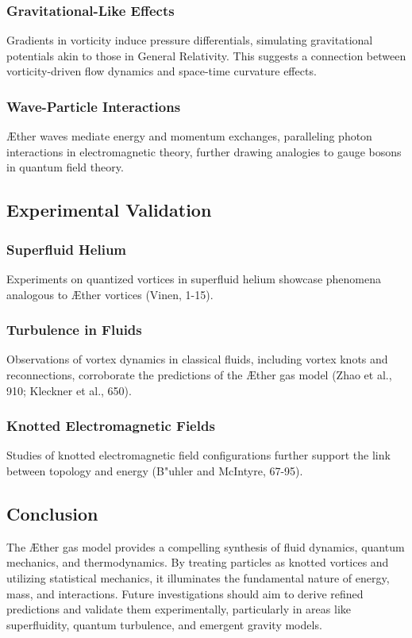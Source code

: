\documentclass[a4paper,10pt]{article}
\begin{document}
\subsubsection*{Gravitational-Like Effects}
Gradients in vorticity induce pressure differentials, simulating gravitational potentials akin to those in General Relativity. This suggests a connection between vorticity-driven flow dynamics and space-time curvature effects.


\subsubsection*{Wave-Particle Interactions}
Æther waves mediate energy and momentum exchanges, paralleling photon interactions in electromagnetic theory, further drawing analogies to gauge bosons in quantum field theory.


\subsection*{Experimental Validation}
\subsubsection*{Superfluid Helium}
Experiments on quantized vortices in superfluid helium showcase phenomena analogous to Æther vortices (Vinen, 1-15).


\subsubsection*{Turbulence in Fluids}
Observations of vortex dynamics in classical fluids, including vortex knots and reconnections, corroborate the predictions of the Æther gas model (Zhao et al., 910; Kleckner et al., 650).


\subsubsection*{Knotted Electromagnetic Fields}
Studies of knotted electromagnetic field configurations further support the link between topology and energy (B"uhler and McIntyre, 67-95).


\subsection*{Conclusion}
The Æther gas model provides a compelling synthesis of fluid dynamics, quantum mechanics, and thermodynamics. By treating particles as knotted vortices and utilizing statistical mechanics, it illuminates the fundamental nature of energy, mass, and interactions. Future investigations should aim to derive refined predictions and validate them experimentally, particularly in areas like superfluidity, quantum turbulence, and emergent gravity models.
\end{document}
